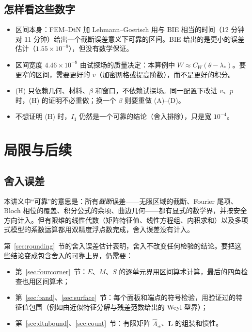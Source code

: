 \documentclass[11pt,a4paper,fontset=fandol]{ctexart}
\begin{document}
\subsection{怎样看这些数字}

\begin{itemize}
\item 区间本身：FEM--DtN 加 Lehmann--Goerisch 用与 BIE 相当的时间（12 分钟对 11 分钟）给出一个截断误差意义下可靠的区间。BIE 给出的是更小的误差估计（$1.55\times10^{-9}$），但没有数学保证。
\item 区间宽度 $4.46\times10^{-9}$ 由试探场的质量决定：本算例中 $W\approx C_W(\theta-\lambda_*)$。要更窄的区间，需要更好的 $v$（加密网格或提高阶数），而不是更好的积分。
\item (H) 只依赖几何、材料、$\beta$ 和窗口，不依赖试探场。同一配置下改进 $v$、$p$ 时，(H) 的证明不必重做；换一个 $\beta$ 则要重做 (A)--(D)。
\item 不想证明 (H) 时，$I_1$ 仍然是一个可靠的结论（舍入排除），只是宽 $10^{-4}$。
\end{itemize}

\section{局限与后续}
\label{sec:limits}
\subsection{舍入误差}

本讲义中“可靠”的意思是：所有\emph{截断}误差——无限区域的截断、Fourier 尾项、Bloch 相位的覆盖、积分公式的余项、曲边几何——都有显式的数学界，并按安全方向计入。但有限维的线性代数（矩阵特征值、线性方程组、内积求和）以及多项式模型的系数运算都用双精度浮点数完成，舍入误差没有计入。

第~\ref{sec:rounding}~节的舍入误差估计表明，舍入不改变任何检验的结论。要把这些结论变成包含舍入的可靠上界，仍需要：
\begin{itemize}
\item 第~\ref{sec:fourcorner}~节：$E$、$M$、$S$ 的逐单元界用区间算术计算，最后的四角检查也用区间算术；
\item 第~\ref{sec:band}、\ref{sec:surface}~节：每个面板和端点的符号检验，用验证过的特征值包围（例如由近似特征分解与残差范数给出的 Weyl 型界）；
\item 第~\ref{sec:dtnbound}、\ref{sec:count}~节：有限矩阵 $\hat\Lambda_\pm$、$\bm L$ 的组装和惯性。
\end{itemize}
\end{document}
